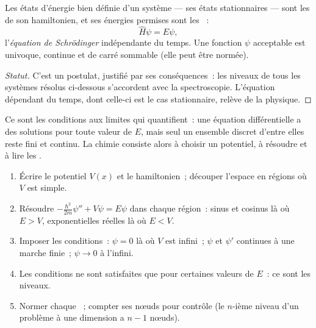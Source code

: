 \begin{theorem}\label{thm:b3:quantum-model-systems:schrodinger}
Les états d'énergie bien définie d'un système --- ses états
stationnaires --- sont les  de son hamiltonien, et ses
énergies permises sont les ~:
\[
\hat H\psi = E\psi,
\]
l'\emph{équation de Schrödinger} indépendante du temps.
Une fonction $\psi$ acceptable est univoque, continue et de carré
sommable (elle peut être normée).
\end{theorem}
\begin{proof}[Statut]
C'est un postulat, justifié par ses conséquences~: les niveaux de tous
les systèmes résolus ci-dessous s'accordent avec la spectroscopie.
L'équation dépendant du temps, dont celle-ci est le cas stationnaire,
relève de la physique.
\end{proof}

Ce sont les conditions aux limites qui quantifient~: une équation
différentielle a des solutions pour toute valeur de $E$, mais seul un
ensemble discret d'entre elles reste fini et continu. La chimie consiste
alors à choisir un potentiel, à résoudre et à lire les .

\begin{method}\label{met:b3:quantum-model-systems:one-dimensional}
\begin{enumerate}
  \item Écrire le potentiel $V(x)$ et le hamiltonien~; découper l'espace en
        régions où $V$ est simple.
  \item Résoudre $-\frac{\hbar^2}{2m}\psi'' + V\psi = E\psi$ dans chaque
        région~: sinus et cosinus là où $E > V$, exponentielles réelles là
        où $E < V$.
  \item Imposer les conditions~: $\psi = 0$ là où $V$ est infini~; $\psi$
        et $\psi'$ continues à une marche finie~; $\psi \to 0$ à l'infini.
  \item Les conditions ne sont satisfaites que pour certaines valeurs de
        $E$~: ce sont les niveaux.
  \item Normer chaque ~; compter ses nœuds pour contrôle (le
        $n$-ième niveau d'un problème à une dimension a $n - 1$ nœuds).
\end{enumerate}
\end{method}

